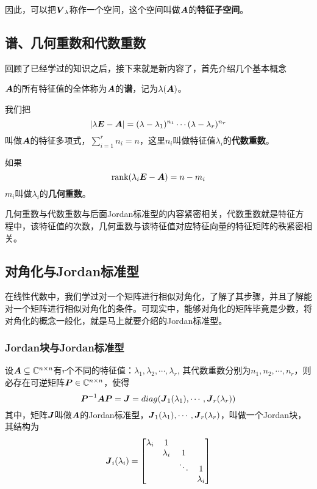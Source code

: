 \documentclass[12pt, a4paper, oneside, UTF8]{ctexbook}
\begin{document}
因此，可以把$\boldsymbol{V}_{\lambda}$称作一个空间，这个空间叫做$\boldsymbol{A}$的\textbf{特征子空间}。

\subsection{谱、几何重数和代数重数}
回顾了已经学过的知识之后，接下来就是新内容了，首先介绍几个基本概念
\begin{defn}{}{}
    $\boldsymbol{A}$的所有特征值的全体称为$\boldsymbol{A}$的\textbf{谱}，记为$\lambda(\boldsymbol{A})$。
\end{defn}
\begin{defn}{}{}
    我们把
    \[|\lambda\boldsymbol{E}-\boldsymbol{A}|=(\lambda-\lambda_1)^{n_1}\cdots(\lambda-\lambda_r)^{n_r}\]叫做$\boldsymbol{A}$的特征多项式，$\sum\limits_{i=1}^{r}n_i=n$，这里$n_i$叫做特征值$\lambda_i$的\textbf{代数重数}。
    
    如果\[\text{rank}(\lambda_i\boldsymbol{E}-\boldsymbol{A})=n-m_i\]$m_i$叫做$\lambda_i$的\textbf{几何重数}。
\end{defn}

几何重数与代数重数与后面Jordan标准型的内容紧密相关，代数重数就是特征方程中，该特征值的次数，几何重数与该特征值对应特征向量的特征矩阵的秩紧密相关。

\subsection{对角化与Jordan标准型}
在线性代数中，我们学过对一个矩阵进行相似对角化，了解了其步骤，并且了解能对一个矩阵进行相似对角化的条件。可现实中，能够对角化的矩阵毕竟是少数，将对角化的概念一般化，就是马上就要介绍的Jordan标准型。

\subsubsection{Jordan块与Jordan标准型}
\begin{them}{}{}
    设$\boldsymbol{A}\subseteq \mathbb{C}^{n\times n}$有$r$个不同的特征值：$\lambda_1, \lambda_2, \cdots,\lambda_r$, 其代数重数分别为$n_1, n_2,\cdots,n_r$，则必存在可逆矩阵$\boldsymbol{P}\in\mathbb{C}^{n\times n}$，使得\[\boldsymbol{P}^{-1}\boldsymbol{A}\boldsymbol{P}=\boldsymbol{J}=diag(\boldsymbol{J}_1(\lambda_1),\cdots,\boldsymbol{J}_r(\lambda_r))\]其中，矩阵$\boldsymbol{J}$叫做$\boldsymbol{A}$的Jordan标准型，$\boldsymbol{J}_1(\lambda_1),\cdots,\boldsymbol{J}_r(\lambda_r)$，叫做一个Jordan块，其结构为\[\boldsymbol{J}_i(\lambda_i)=\begin{bmatrix}
    \lambda_i&1&&\\
    &\lambda_i&1&\\
    &&\ddots&1\\
    &&&\lambda_i
    \end{bmatrix}\]
\end{them}
\end{document}
